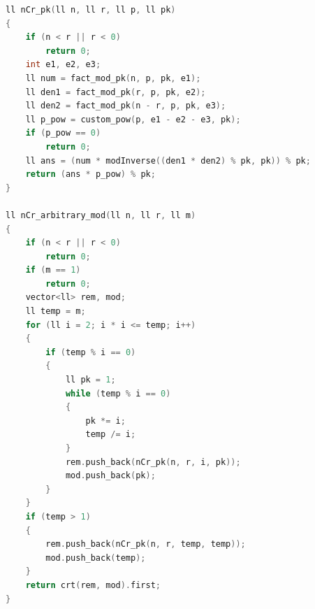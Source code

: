 \documentclass[10pt,landscape,a4paper,twocolumn]{article}
\begin{document}
\begin{lstlisting}[language=C++]
ll nCr_pk(ll n, ll r, ll p, ll pk)
{
    if (n < r || r < 0)
        return 0;
    int e1, e2, e3;
    ll num = fact_mod_pk(n, p, pk, e1);
    ll den1 = fact_mod_pk(r, p, pk, e2);
    ll den2 = fact_mod_pk(n - r, p, pk, e3);
    ll p_pow = custom_pow(p, e1 - e2 - e3, pk);
    if (p_pow == 0)
        return 0;
    ll ans = (num * modInverse((den1 * den2) % pk, pk)) % pk;
    return (ans * p_pow) % pk;
}

ll nCr_arbitrary_mod(ll n, ll r, ll m)
{
    if (n < r || r < 0)
        return 0;
    if (m == 1)
        return 0;
    vector<ll> rem, mod;
    ll temp = m;
    for (ll i = 2; i * i <= temp; i++)
    {
        if (temp % i == 0)
        {
            ll pk = 1;
            while (temp % i == 0)
            {
                pk *= i;
                temp /= i;
            }
            rem.push_back(nCr_pk(n, r, i, pk));
            mod.push_back(pk);
        }
    }
    if (temp > 1)
    {
        rem.push_back(nCr_pk(n, r, temp, temp));
        mod.push_back(temp);
    }
    return crt(rem, mod).first;
}
\end{lstlisting}
\end{document}
